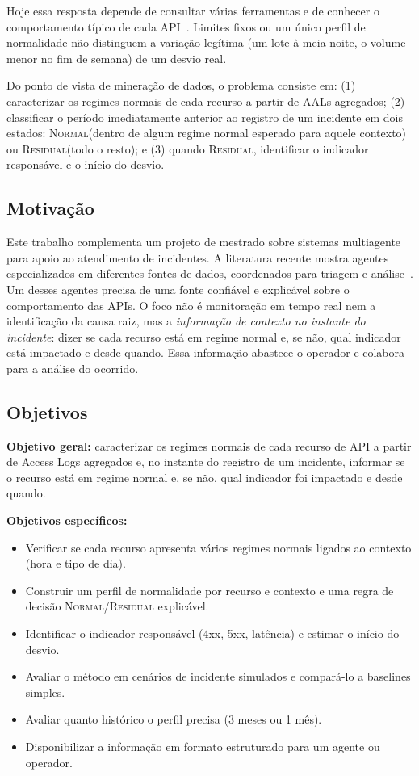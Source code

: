 \documentclass[sigconf,nonacm]{acmart}
\newcommand{\Normal}{\textsc{Normal}\xspace}
\newcommand{\Residual}{\textsc{Residual}\xspace}
\begin{document}
Hoje essa resposta depende de consultar várias ferramentas e de conhecer o comportamento típico de cada API~\citep{zhang2025isre}. Limites fixos ou um único perfil de normalidade não distinguem a variação legítima (um lote à meia-noite, o volume menor no fim de semana) de um desvio real.

Do ponto de vista de mineração de dados, o problema consiste em: (1) caracterizar os regimes normais de cada recurso a partir de AALs agregados; (2) classificar o período imediatamente anterior ao registro de um incidente em dois estados: \Normal (dentro de algum regime normal esperado para aquele contexto) ou \Residual (todo o resto); e (3) quando \Residual, identificar o indicador responsável e o início do desvio.

\subsection{Motivação}
Este trabalho complementa um projeto de mestrado sobre sistemas multiagente para apoio ao atendimento de incidentes. A literatura recente mostra agentes especializados em diferentes fontes de dados, coordenados para triagem e análise~\citep{yu2025triangle,luo2025opsagent,zhang2025isre}. Um desses agentes precisa de uma fonte confiável e explicável sobre o comportamento das APIs. O foco não é monitoração em tempo real nem a identificação da causa raiz, mas a \emph{informação de contexto no instante do incidente}: dizer se cada recurso está em regime normal e, se não, qual indicador está impactado e desde quando. Essa informação abastece o operador e colabora para a análise do ocorrido.

\subsection{Objetivos}
\textbf{Objetivo geral:} caracterizar os regimes normais de cada recurso de API a partir de Access Logs agregados e, no instante do registro de um incidente, informar se o recurso está em regime normal e, se não, qual indicador foi impactado e desde quando.

\textbf{Objetivos específicos:}
\begin{itemize}
  \item Verificar se cada recurso apresenta vários regimes normais ligados ao contexto (hora e tipo de dia).
  \item Construir um perfil de normalidade por recurso e contexto e uma regra de decisão \Normal/\Residual explicável.
  \item Identificar o indicador responsável (4xx, 5xx, latência) e estimar o início do desvio.
  \item Avaliar o método em cenários de incidente simulados e compará-lo a baselines simples.
  \item Avaliar quanto histórico o perfil precisa (3 meses ou 1 mês).
  \item Disponibilizar a informação em formato estruturado para um agente ou operador.
\end{itemize}
\end{document}
